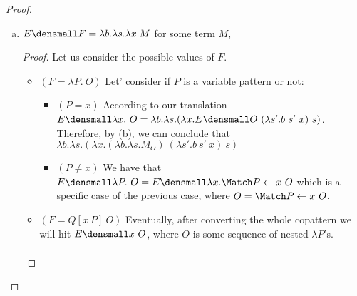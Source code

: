 \begin{proof}
\begin{enumerate}[(a)]
\begin{proof}
\begin{itemize}
\begin{align*}
\begin{aligned}[t]
            \end{aligned}  & (IH, \cref{l-trans-terms})
            \end{align*}
    \item $(O = \Nest O)$
        \begin{align*}
            & \quad E\den{\Nest O} = \lambda b. \lambda s. \Rec s' = E\den{O} ~ (\lambda \_. b ~ s) ~ (\lambda x. s' ~ x)\\
            =& \quad \lambda b. \lambda s. \Rec s' = (\lambda b. \lambda s.~ M_O) ~ (\lambda \_. b ~ s) ~ (\lambda x. s' ~ x) & (IH)
        \end{align*}
    \item $(O = \Try x \to B)$ 
        \begin{align*}
            & \quad E\den{\Try x \to B} = \lambda x. T\den{B}\\
            =& \quad \lambda x. (\lambda s.~ M_B) & (a) \\
            =& \quad \lambda b. (\lambda s.~ M_B)\subst{x}{b} & (=_{\alpha})
        \end{align*}
    \end{itemize}
    \qed
\end{proof}
\item $E\den{F} = \lambda b. \lambda s. \lambda x. M$ for some term $M$,
\begin{proof}
    Let us consider the possible values of $F$.
    \begin{itemize}
        \item $(F= \lambda P. ~O)$ Let' consider if $P$ is a variable pattern or not:
        \begin{itemize}
            \item $(P = x)$ According to our translation $E\den{\lambda x. ~O}=\lambda b. \lambda s. (\lambda x. E\den{O} ~ (\lambda s'. b ~ s' ~ x) ~ s)$.
            Therefore, by (b), we can conclude that $\lambda b. \lambda s. (\lambda x. (\lambda b. \lambda s. M_O) ~ (\lambda s'. b ~ s' ~ x) ~ s)$
            \item $(P \neq x)$ We have that $E\den{\lambda P. ~O}=E\den{\lambda x. \Match P \gets x ~ O}$ which is a specific case of the previous case, where $O=\Match P \gets x ~ O$.
        \end{itemize} 
        \item $(F= Q[x ~P] ~O)$ Eventually, after converting the whole copattern we will hit $E\den{x ~O}$, where $O$ is some sequence of nested $\lambda P$'s.
        \begin{align*}

\end{align*}
\end{itemize}
\end{proof}
\end{enumerate}
\end{proof}
